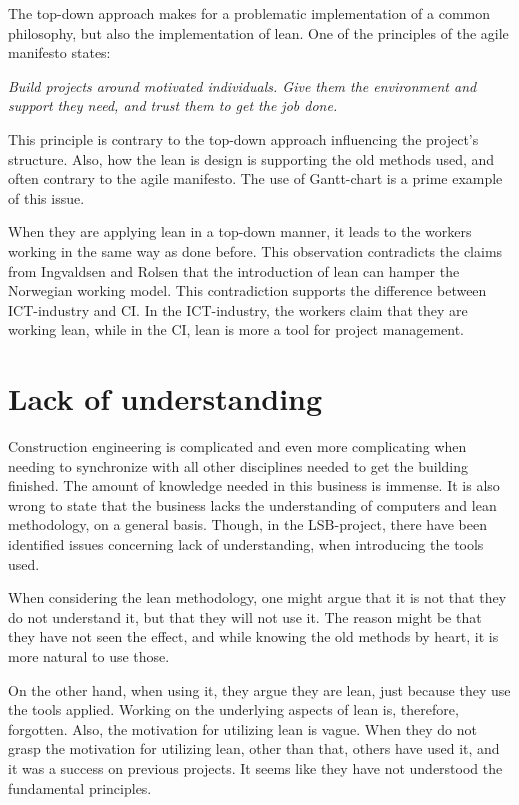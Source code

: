 The top-down approach makes for a problematic implementation of a common philosophy, but also the implementation of lean. One of the principles of the agile manifesto \cite{agile_manifesto} states:

\textit{Build projects around motivated individuals. Give them the environment and support they need, and trust them to get the job done.}

This principle is contrary to the top-down approach influencing the project's structure. Also, how the lean is design is supporting the old methods used, and often contrary to the agile manifesto. The use of Gantt-chart is a prime example of this issue. 

When they are applying lean in a top-down manner, it leads to the workers working in the same way as done before. This observation contradicts the claims from Ingvaldsen and Rolsen that the introduction of lean can hamper the Norwegian working model. This contradiction supports the difference between ICT-industry and CI. In the ICT-industry, the workers claim that they are working lean, while in the CI, lean is more a tool for project management.
\section{Lack of understanding} \label{sec:dis_understanding}
Construction engineering is complicated and even more complicating when needing to synchronize with all other disciplines needed to get the building finished. The amount of knowledge needed in this business is immense. It is also wrong to state that the business lacks the understanding of computers and lean methodology, on a general basis. Though, in the LSB-project, there have been identified issues concerning lack of understanding, when introducing the tools used. 

When considering the lean methodology, one might argue that it is not that they do not understand it, but that they will not use it. The reason might be that they have not seen the effect, and while knowing the old methods by heart, it is more natural to use those. 

On the other hand, when using it, they argue they are lean, just because they use the tools applied. Working on the underlying aspects of lean is, therefore, forgotten. Also, the motivation for utilizing lean is vague. When they do not grasp the motivation for utilizing lean, other than that, others have used it, and it was a success on previous projects. It seems like they have not understood the fundamental principles. 

